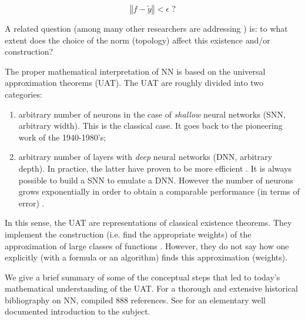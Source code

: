 \documentclass{article}
\begin{document}
\[
\left\Vert f-\widetilde{y}\right\Vert <\epsilon\text{ ?}%
\]

A related question (among many other researchers are addressing \citep{fan2020universal}) is: to what extent does the choice of the norm (topology) affect this existence and/or construction?

The proper mathematical interpretation of NN is based on the universal
approximation theorems (UAT). The UAT are roughly divided into two categories:

\begin{enumerate}
\item arbitrary number of neurons in the case of {\it shallow} neural networks (SNN, arbitrary width). This is the classical case. It goes back to the pioneering work of the 1940-1980's;

\item arbitrary number of layers with {\it deep} neural networks (DNN, arbitrary
depth). In practice, the latter have proven to be more efficient
\citep{mhaskar2019function}. It is always possible to build a SNN to emulate a DNN. However the number of neurons grows exponentially in order to obtain a
comparable performance (in terms of error) \citep{telgarsky2016benefits,eldan2016power}.
\end{enumerate}

In this sense, the UAT are representations of classical existence theorems. They implement the construction (i.e. find the appropriate weights) of the approximation of large classes of functions \citep{paluzo2020two}. However, they do not say how one explicitly (with a formula or an algorithm) finds this approximation (weights).

We give a brief summary of some of the conceptual steps that led to today's mathematical understanding of the UAT. For a thorough and extensive historical
bibliography on NN, \cite{schmidhuber2015deep} compiled 888
references. See \cite{goodfellow2016deep} for an elementary well documented
introduction to the subject.
\end{document}
